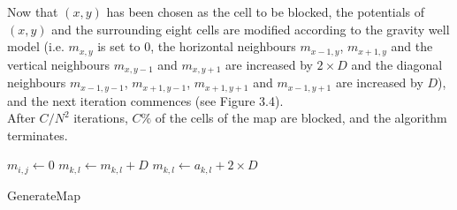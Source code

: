 \documentclass[12pt,notitlepage]{report}
\begin{document}
\noindent
Now that $(x,y)$ has been chosen as the cell to be blocked, the potentials of $(x,y)$ and the surrounding eight cells are modified according to the gravity well model (i.e. $m_{x,y}$ is set to $0$, the horizontal neighbours $m_{x-1,y}$, $m_{x+1,y}$ and the vertical neighbours $m_{x,y-1}$ and $m_{x,y+1}$ are increased by $2 \times D$ and the diagonal neighbours $m_{x-1,y-1}$, $m_{x+1,y-1}$, $m_{x+1,y+1}$ and $m_{x-1,y+1}$ are increased by $D$), and the next iteration commences (see Figure 3.4).\\

\noindent
After $C/N^{2}$ iterations, $C\%$ of the cells of the map are blocked, and the algorithm terminates.

\begin{algorithm}
  \SetAlgoLined\DontPrintSemicolon
   
   {
    \nl $m_{i,j} \gets 0$\;
    \nl {} {
      \nl {} {
        \nl $m_{k,l} \gets m_{k,l} + D$\;
      }
  }
  \nl {} {
      \nl {} {
        $m_{k,l} \gets a_{k,l} + 2\times D$\;
      }
  }
}
\caption{{\sc GenerateMap}}
 \end{algorithm} 
 
\end{document}

